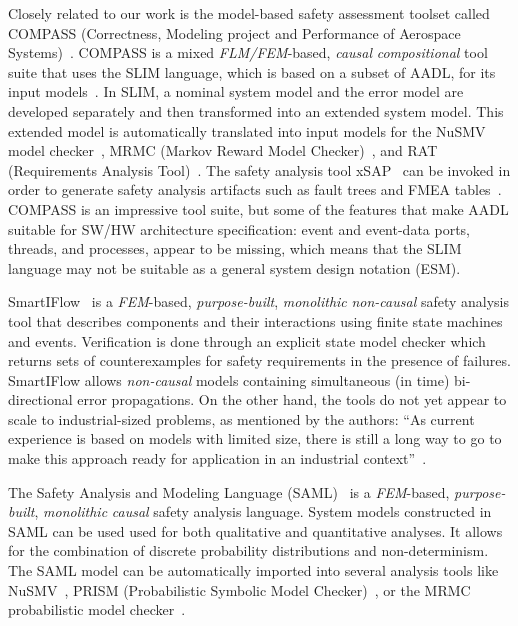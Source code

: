 Closely related to our work is the model-based safety assessment toolset called COMPASS (Correctness, Modeling project and Performance of Aerospace Systems)~\cite{10.1007/978-3-642-04468-7_15}.  COMPASS is a mixed {\em FLM/FEM}-based, {\em causal} {\em compositional} tool suite that uses the SLIM language, which is based on a subset of AADL, for its input models~\cite{5185388, criticalembeddedsystems}. In SLIM, a nominal system model and the error model are developed separately and then transformed into an extended system model.  This extended model is automatically translated into input models for the NuSMV model checker~\cite{Cimatti2000, NuSMV}, MRMC (Markov Reward Model Checker)~\cite{Katoen:2005:MRM:1114692.1115230, MRMC}, and RAT (Requirements Analysis Tool)~\cite{RAT}. The safety analysis tool xSAP~\cite{DBLP:conf/tacas/BittnerBCCGGMMZ16} can be invoked in order to generate safety analysis artifacts such as fault trees and FMEA tables~\cite{compass30toolset}.  COMPASS is an impressive tool suite, but some of the features that make AADL suitable for SW/HW architecture specification: event and event-data ports, threads, and processes, appear to be missing, which means that the SLIM language may not be suitable as a general system design notation (ESM).

SmartIFlow~\cite{info8010007} is a {\em FEM}-based, {\em purpose-built}, {\em monolithic} {\em non-causal} safety analysis tool that describes components and their interactions using finite state machines and events. Verification is done through an explicit state model checker which returns sets of counterexamples for safety requirements in the presence of failures.  SmartIFlow allows {\em non-causal} models containing simultaneous (in time) bi-directional %
error propagations.  On the other hand, the tools do not yet appear to scale to industrial-sized problems, as mentioned by the authors: ``As current experience is based on models with limited size, there is still a long way to go to make this approach ready for application in an industrial context''~\cite{info8010007}.


The Safety Analysis and Modeling Language (SAML)~\cite{Gudemann:2010:FQQ:1909626.1909813} is a {\em FEM}-based, {\em purpose-built}, {\em monolithic} {\em causal} safety analysis language.  System models constructed in SAML can be used used for both qualitative and quantitative analyses. It allows for the combination of discrete probability distributions and non-determinism. The SAML model can be automatically imported into several analysis tools like NuSMV~\cite{Cimatti2000}, PRISM (Probabilistic Symbolic Model Checker)~\cite{CAV2011:KwNoPa}, or the MRMC probabilistic model checker~\cite{Katoen:2005:MRM:1114692.1115230}. 

